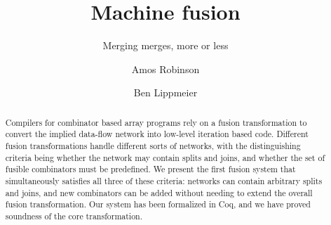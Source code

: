 \documentclass[acmlarge,review,anonymous]{acmart}\settopmatter{printfolios=true}
\begin{document}
\title{Machine fusion}
\subtitle{Merging merges, more or less}

\author{Amos Robinson}

\author{Ben Lippmeier}

\makeatactive
\begin{abstract}
Compilers for combinator based array programs rely on a fusion transformation to convert the implied data-flow network into low-level iteration based code. Different fusion transformations handle different sorts of networks, with the distinguishing criteria being whether the network may contain splits and joins, and whether the set of fusible combinators must be predefined. We present the first fusion system that simultaneously satisfies all three of these criteria: networks can contain arbitrary splits and joins, and new combinators can be added without needing to extend the overall fusion transformation. Our system has been formalized in Coq, and we have proved soundness of the core transformation.
\end{abstract}


\maketitle













\end{document}

